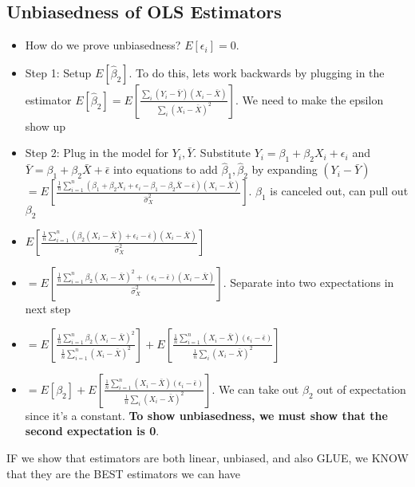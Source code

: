 \documentclass[10pt, oneside]{article}
\begin{document}
\subsection{Unbiasedness of OLS Estimators}
\begin{itemize}
    \item How do we prove unbiasedness? $E[\epsilon_i]=0$. 
    \item Step 1: Setup $E[\hat \beta_2 ]$. To do this, lets work backwards by plugging in the estimator $E[\hat \beta_2]=E[\frac{\sum_i (Y_i -\bar Y) (X_i -\bar X)}{\sum_i (X_i -\bar X)^2}]$. We need to make the epsilon show up 
    \item Step 2: Plug in the model for $Y_i, \bar Y$. Substitute $Y_i=\beta_1 + \beta_2 X_i + \epsilon_i$ and $\bar Y=\beta_1 +\beta_2 \bar X + \bar \epsilon$ into equations to add $\hat \beta_1, \hat \beta_2$ by expanding $(Y_i -\bar Y)$ \\
    $=E[\frac{\frac{1}{n} 
    \sum_{i=1} ^ n(\beta_1 + \beta_2 X_i + \epsilon_i - \beta_1 - \beta_2 \bar X -\bar \epsilon)(X_i -\bar X)}{\hat \sigma_X ^2}]$. $\beta_1$ is canceled out, can pull out $\beta_2$
    \item $E[\frac{\frac{1}{n} \sum_{i=1} ^ n (\beta_2 (X_i -\bar X) + \epsilon_i -\bar \epsilon)(X_i -\bar X)}{\hat \sigma_X ^2}]$
    \item $=E[\frac{\frac{1}{n} \sum_{i=1}^n \beta_2 (X_i - \bar X)^2 + (\epsilon_i -\bar \epsilon) (X_i -\bar X)}{\hat \sigma_X ^2}]$. Separate into two expectations in next step
    \item $=E[\frac{\frac{1}{n}\sum_{i=1} ^n \beta_2 (X_i -\bar X)^2}{\frac{1}{n} \sum_{i=1} ^n (X_i - \bar X)^2}] + E[ \frac{\frac{1}{n}\sum_{i=1} ^ n (X_i -\bar X) (\epsilon_i -\bar \epsilon)}{\frac{1}{n} \sum_i(X_i -\bar X)^2}]$
    \item $=E[\beta_2] + E[ \frac{\frac{1}{n}\sum_{i=1} ^ n (X_i -\bar X) (\epsilon_i -\bar \epsilon)}{\frac{1}{n} \sum_i(X_i -\bar X)^2}]$. We can take out $\beta_2$ out of expectation since it's a constant. \textbf{To show unbiasedness, we must show that the second expectation is 0}.
\end{itemize}

IF we show that estimators are both linear, unbiased, and also GLUE, we KNOW that they are the BEST estimators we can have
\end{document}
